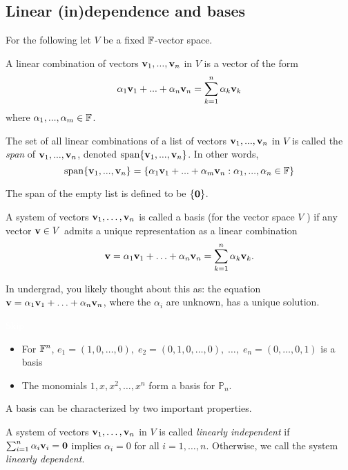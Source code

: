 \documentclass{article}
\begin{document}
\subsection{Linear (in)dependence and bases}
For the following let $V$ be a fixed ${\mathbb{F}}$-vector space.

\begin{definition}
A linear combination of vectors ${\mathbf{v}}_{1},...,{\mathbf{v}}_{n}$  in $V$ is a vector of the form 
$$
\alpha_{1}{\mathbf{v}}_{1}+...+\alpha_{n}{\mathbf{v}}_{n} = \sum_{k=1}^n \alpha_k {\mathbf{v}}_k
$$
 where $\alpha_{1},...,\alpha_{m} \in {\mathbb{F}}$.
\end{definition}

\begin{definition}
The set of all linear combinations of a list of vectors
${\mathbf{v}}_{1},...,{\mathbf{v}}_{n}$ in $V$ is called the \emph{span} of ${\mathbf{v}}_{1},...,{\mathbf{v}}_{n}$,
denoted $\mathrm{span}\{{\mathbf{v}}_{1},...,{\mathbf{v}}_{n}\}$. In other words, 
$$
\mathrm{span}\{{\mathbf{v}}_{1},...,{\mathbf{v}}_{n}\}=\{\alpha_{1}{\mathbf{v}}_{1}+...+\alpha_{m}{\mathbf{v}}_{n} :\alpha_{1},...,\alpha_{n}\in{\mathbb{F}}\}
$$
\end{definition}
The span of the empty list is defined to be $\{{\mathbf{0}}\}$.

\begin{definition}
A system of vectors ${\mathbf{v}}_1, \ldots, {\mathbf{v}}_n$ is called a basis (for the vector space $V$ ) if any vector ${\mathbf{v}} \in V$ admits a unique representation as a linear combination
$$
{\mathbf{v}} = \alpha_1 {\mathbf{v}}_1 + \ldots + \alpha_n {\mathbf{v}}_n = \sum_{k=1}^n \alpha_k {\mathbf{v}}_k.
$$
\end{definition}

In undergrad, you likely thought about this as: the equation ${\mathbf{v}} = \alpha_1 {\mathbf{v}}_1 + \ldots + \alpha_n {\mathbf{v}}_n$, where the $\alpha_i$ are unknown, has a unique solution.

\begin{example}
\textcolor{white}{Skip}
\begin{itemize}
    \item For ${\mathbb{F}}^n$, $e_1 = (1,0,\ldots, 0), \; e_2 = (0,1,0,\ldots,0), \; \ldots, \; e_n = (0, \ldots, 0, 1)$ is a basis
    \item The monomials $ 1, x, x^2, \ldots, x^n$ form a basis for $\mathbb{P}_n$.
\end{itemize}
\end{example}

A basis can be characterized by two important properties.

\begin{definition}
A system of vectors ${\mathbf{v}}_1,\ldots,{\mathbf{v}}_n$ in $V$ is called \emph{linearly independent} if $\sum_{i=1}^n \alpha_i{\mathbf{v}}_i = {\mathbf{0}}$ implies $\alpha_i=0$ for all $i=1,\ldots,n$. Otherwise, we call the system \emph{linearly dependent}.
\end{definition}
\end{document}
